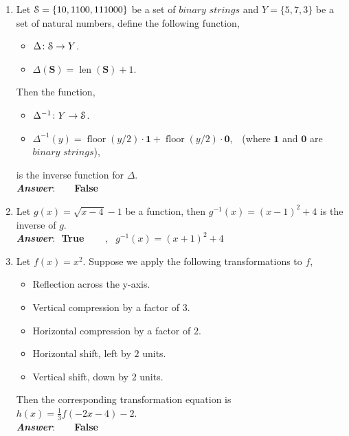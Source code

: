 \documentclass[12pt]{article} %
\begin{document}
\begin{qstn}
\begin{enumerate}
   \item Let $ \EuScript{S} = \{10,1100, 111000\} $ be a set of $\textit{binary strings}$ and $ Y =
     \{5,7,3\} $ be a set of natural numbers, define the following function, 
              \begin{itemize}
                \item $\Delta \colon \EuScript{S} \to Y$.
                \item $\Delta(\textbf{S}) = \operatorname{len}(\textbf{S}) + 1$.
              \end{itemize}
              Then the function,
              \begin{itemize}
                \item $\Delta^{-1} \colon Y \to \EuScript{S}$.
                \item $\Delta^{-1}(y) = \operatorname{floor}(y / 2)\cdot \textbf{1} + \operatorname{floor}(y /
                  2)\cdot \textbf{0}$,
                  \,\,\,\,(where $\textbf{1}$ and $\textbf{0}$ are $\textit{binary strings}$),
              \end{itemize}
              is the inverse function for $\Delta$.\\
       \textbf{\emph{Answer}}:\,\,  \,\,\,\,\,\, \textbf{False}\,
        

    \item Let $g(x) = \sqrt{x - 4} - 1$ be a function, then $g^{-1}(x) = (x-1)^2 + 4 $ is the inverse of
      $g$.\\
       \textbf{\emph{Answer}}:\,\, \textbf{True} \,\,\,\,\,\, \, , \,
          $g^{-1}(x) = (x + 1)^2 + 4$

    \item Let $f(x) = x^2 $. Suppose we apply the following transformations to $f$,
      \begin{itemize}
        \item Reflection across the y-axis.
        \item Vertical compression by a factor of $3$. 
        \item Horizontal compression by a factor of $2$.
        \item Horizontal shift, left by $2$ units.
        \item Vertical shift, down by $2$ units.
      \end{itemize}
      Then the corresponding transformation equation is $h(x) = \frac{1}{3}f(-2x - 4) - 2$.\\
       \textbf{\emph{Answer}}:\,\,  \,\,\,\,\,\, \textbf{False}\,


\end{enumerate}
\end{qstn}
\end{document}
